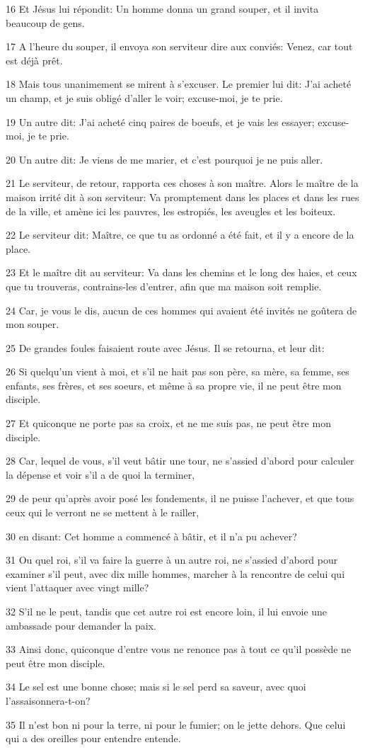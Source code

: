 \par 16 Et Jésus lui répondit: Un homme donna un grand souper, et il invita beaucoup de gens.
\par 17 A l'heure du souper, il envoya son serviteur dire aux conviés: Venez, car tout est déjà prêt.
\par 18 Mais tous unanimement se mirent à s'excuser. Le premier lui dit: J'ai acheté un champ, et je suis obligé d'aller le voir; excuse-moi, je te prie.
\par 19 Un autre dit: J'ai acheté cinq paires de boeufs, et je vais les essayer; excuse-moi, je te prie.
\par 20 Un autre dit: Je viens de me marier, et c'est pourquoi je ne puis aller.
\par 21 Le serviteur, de retour, rapporta ces choses à son maître. Alors le maître de la maison irrité dit à son serviteur: Va promptement dans les places et dans les rues de la ville, et amène ici les pauvres, les estropiés, les aveugles et les boiteux.
\par 22 Le serviteur dit: Maître, ce que tu as ordonné a été fait, et il y a encore de la place.
\par 23 Et le maître dit au serviteur: Va dans les chemins et le long des haies, et ceux que tu trouveras, contrains-les d'entrer, afin que ma maison soit remplie.
\par 24 Car, je vous le dis, aucun de ces hommes qui avaient été invités ne goûtera de mon souper.
\par 25 De grandes foules faisaient route avec Jésus. Il se retourna, et leur dit:
\par 26 Si quelqu'un vient à moi, et s'il ne hait pas son père, sa mère, sa femme, ses enfants, ses frères, et ses soeurs, et même à sa propre vie, il ne peut être mon disciple.
\par 27 Et quiconque ne porte pas sa croix, et ne me suis pas, ne peut être mon disciple.
\par 28 Car, lequel de vous, s'il veut bâtir une tour, ne s'assied d'abord pour calculer la dépense et voir s'il a de quoi la terminer,
\par 29 de peur qu'après avoir posé les fondements, il ne puisse l'achever, et que tous ceux qui le verront ne se mettent à le railler,
\par 30 en disant: Cet homme a commencé à bâtir, et il n'a pu achever?
\par 31 Ou quel roi, s'il va faire la guerre à un autre roi, ne s'assied d'abord pour examiner s'il peut, avec dix mille hommes, marcher à la rencontre de celui qui vient l'attaquer avec vingt mille?
\par 32 S'il ne le peut, tandis que cet autre roi est encore loin, il lui envoie une ambassade pour demander la paix.
\par 33 Ainsi donc, quiconque d'entre vous ne renonce pas à tout ce qu'il possède ne peut être mon disciple.
\par 34 Le sel est une bonne chose; mais si le sel perd sa saveur, avec quoi l'assaisonnera-t-on?
\par 35 Il n'est bon ni pour la terre, ni pour le fumier; on le jette dehors. Que celui qui a des oreilles pour entendre entende.

